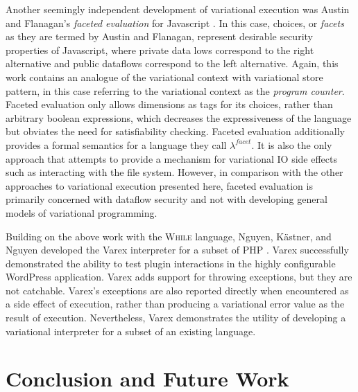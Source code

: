 \documentclass[onehalf,11pt]{beavtex}
\begin{document}
 Another seemingly independent development of variational execution was Austin and Flanagan's \emph{faceted evaluation} for Javascript \cite{faceted}.
 In this case, choices, or \emph{facets} as they are termed by Austin and Flanagan, represent desirable security properties of Javascript, where
 private data lows correspond to the right alternative and public dataflows correspond to the left alternative.
 Again, this work contains an analogue of the variational context with variational store pattern, in this case referring to the variational context as
 the \emph{program counter}. Faceted evaluation only allows dimensions as tags for its choices, rather than arbitrary boolean expressions, which
 decreases the expressiveness of the language but obviates the need for satisfiability checking. Faceted evaluation additionally provides a formal
 semantics for a language they call $\lambda^{\mathit{facet}}$. It is also the only approach that attempts to provide a mechanism for variational IO
 side effects such as interacting with the file system. However, in comparison with the other approaches to variational execution presented here,
 faceted evaluation is primarily concerned with dataflow security and not with developing general models of variational programming.
 
 Building on the above work with the \textsc{While} language, Nguyen, K\"astner, and Nguyen developed the Varex interpreter for a subset of PHP \cite{varex}.
 Varex successfully demonstrated the ability to test plugin interactions in the highly configurable WordPress application. Varex adds support for throwing
 exceptions, but they are not catchable. Varex's exceptions are also reported directly when encountered as a side effect of execution, rather than producing
 a variational error value as the result of execution. Nevertheless, Varex demonstrates the utility of developing a variational interpreter for a subset of an
 existing language.
 
  

\chapter{Conclusion and Future Work}
\label{ch:conc}




\end{document}
